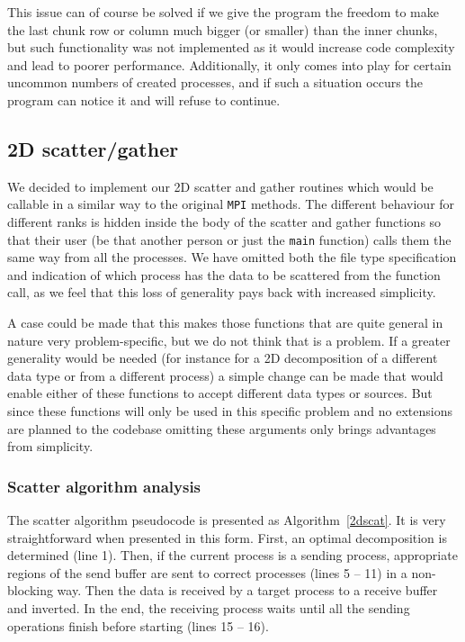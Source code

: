 \documentclass[11pt,a4paper]{article}
\begin{document}
This issue can of course be solved if we give the program the freedom to make the last chunk row or column much bigger (or smaller) than the inner chunks, but such functionality was not implemented as it would increase code complexity and lead to poorer performance. 
Additionally, it only comes into play for certain uncommon numbers of created processes, and if such a situation occurs the program can notice it and will refuse to continue.

\subsection{2D scatter/gather}
\label{sec:2dscatgat}
We decided to implement our 2D scatter and gather routines which would be callable in a similar way to the original \texttt{MPI} methods. 
The different behaviour for different ranks is hidden inside the body of the scatter and gather functions so that their user (be that another person or just the \texttt{main} function) calls them the same way from all the processes. 
We have omitted both the file type specification and indication of which process has the data to be scattered from the function call, as we feel that this loss of generality pays back with increased simplicity. 

A case could be made that this makes those functions that are quite general in nature very problem-specific, but we do not think that is a problem. 
If a greater generality would be needed (for instance for a 2D decomposition of a different data type or from a different process) a simple change can be made that would enable either of these functions to accept different data types or sources. 
But since these functions will only be used in this specific problem and no extensions are planned to the codebase omitting these arguments only brings advantages from simplicity.

\subsubsection{Scatter algorithm analysis}
The scatter algorithm pseudocode is presented as Algorithm~\ref{2dscat}. 
It is very straightforward when presented in this form. First, an optimal decomposition is determined (line 1). 
Then, if the current process is a sending process, appropriate regions of the send buffer are sent to correct processes (lines 5 -- 11) in a non-blocking way. 
Then the data is received by a target process to a receive buffer and inverted. In the end, the receiving process waits until all the sending operations finish before starting (lines 15 -- 16).
\end{document}
